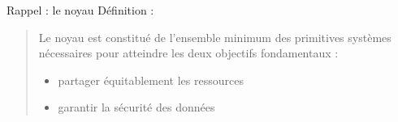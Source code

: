 \def\inc{inc1-intro}




\begin {frame} {Rappel : le noyau}
    Définition :

    \begin {quote}
	Le noyau est constitué de l'ensemble minimum des primitives
	systèmes nécessaires pour atteindre les deux objectifs
	fondamentaux :

	\begin {itemize}
	    \item partager équitablement les ressources
	    \item garantir la sécurité des données
	\end {itemize}

    \end {quote}
\end {frame}

